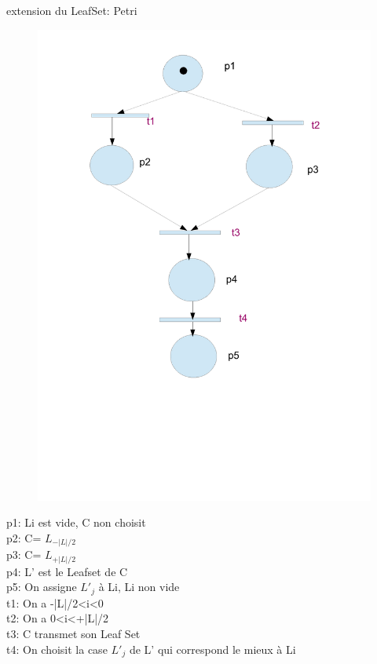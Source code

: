 \documentclass[french]{beamer}
\begin{document}
\begin{frame}{extension du LeafSet: Petri}
\begin{figure}
\includegraphics[width=0.7\linewidth]{"petri_leafset"} 
\end{figure}
\end{frame}
\begin{frame}
\begin{Large}
p1: Li est vide, C non choisit\\

p2: C=	$ L_{-|L|/2} $ \\

p3: C=	$ L_{+|L|/2} $ \\

p4: L' est le Leafset de C	\\

p5: On assigne $ L'_{j} $ à Li, Li non vide\\


t1: On a -|L|/2<i<0\\
t2: On a 0<i<+|L|/2\\
t3: C transmet son Leaf Set\\
t4: On choisit la case $ L'_{j} $ de L' qui correspond le mieux à Li\\
\end{Large}
\end{frame}
\end{document}
